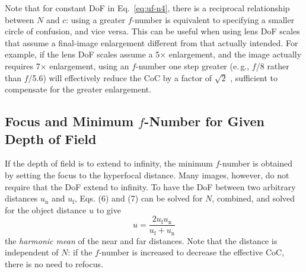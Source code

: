 \documentclass[11pt, oneside]{scrartcl}   	%
\begin{document}
Note that for constant DoF in Eq.~\ref{eq:uf-n4}, there is a reciprocal relationship between $N$ and
$c$: using a greater $f$-number is equivalent to specifying a smaller circle of confusion, and vice versa. This can be useful when using lens DoF scales that assume a final-image enlargement different from that actually intended. For example, if the lens DoF scales assume a 5× enlargement, and the image actually requires 7× enlargement, using an $f$-number one step greater (e.\,g., $f$/8 rather than $f/$5.6) will effectively reduce the CoC by a factor of $\sqrt 2$ , sufficient to compensate for the greater enlargement.
\subsection{Focus and Minimum $f$-Number for Given Depth of Field}

If the depth of field is to extend to infinity, the minimum $f$-number
is obtained by setting the focus to the hyperfocal distance. Many
images, however, do not require that the DoF extend to infinity. To
have the DoF between two arbitrary distances $u_\mathrm{n}$ and $u_\mathrm{f}$, Eqs. (6)
and (7) can be solved for $N$, combined, and solved for the object
distance $u$ to give
\begin{equation}
  \label{eq:u}
  u = \frac{2u_\mathrm{f}u_\mathrm{n}}{u_\mathrm{f}+u_\mathrm{n}}
\end{equation}
the \emph{harmonic mean} of the near and far distances. Note that the distance is independent of $N$: if the $f$-number is increased to decrease the effective CoC, there is no need to refocus.
\end{document}

